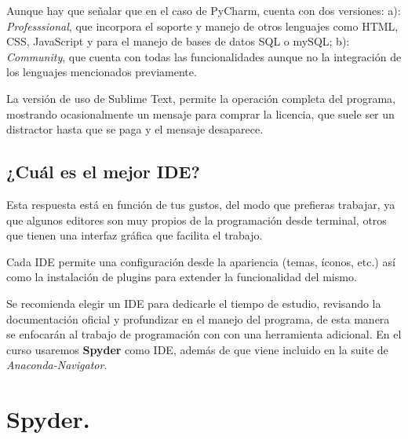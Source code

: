 Aunque hay que señalar que en el caso de PyCharm, cuenta con dos versiones: a): \textit{Professsional}, que incorpora el soporte y manejo de otros lenguajes como HTML, CSS, JavaScript y para el manejo de bases de datos SQL o mySQL; b): \textit{Community}, que cuenta con todas las funcionalidades aunque no la integración de los lenguajes mencionados previamente.
\par
La versión de uso de Sublime Text, permite la operación completa del programa, mostrando ocasionalmente un mensaje para comprar la licencia, que suele ser un distractor hasta que se paga y el mensaje desaparece.

\subsection{¿Cuál es el mejor IDE?}

Esta respuesta está en función de tus gustos, del modo que prefieras trabajar, ya que algunos editores son muy propios de la programación desde terminal, otros que tienen una interfaz gráfica que facilita el trabajo.
\par
Cada IDE permite una configuración desde la apariencia (temas, íconos, etc.) así como la instalación de plugins para extender la funcionalidad del mismo.
\par
Se recomienda elegir un IDE para dedicarle el tiempo de estudio, revisando la documentación oficial y profundizar en el manejo del programa, de esta manera se enfocarán al trabajo de programación con \python{} con una herramienta adicional. En el curso usaremos \textbf{Spyder} como IDE, además de que viene incluido en la suite de \textit{Anaconda-Navigator}.

\section{Spyder.}

